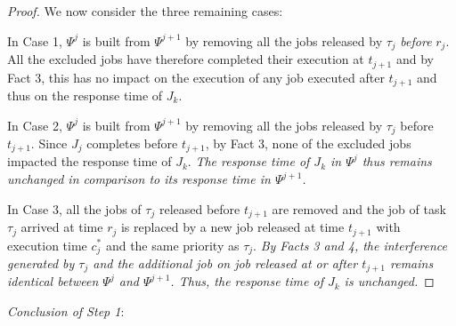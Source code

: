 \begin{proof}

We now consider the three remaining cases:

\noindent In Case 1, $\Psi^j$ is built from $\Psi^{j+1}$ by removing all the jobs released by $\tau_j$ \emph{before} $r_j$.  All the excluded jobs have therefore completed their execution at $t_{j+1}$ and by Fact 3, this has no impact on the execution of any job executed after $t_{j+1}$ and thus on the response time of $J_k$.

\noindent In Case 2, $\Psi^j$ is built from $\Psi^{j+1}$ by removing all the jobs released by $\tau_j$ before $t_{j+1}$. Since $J_{j}$ completes before $t_{j+1}$, by Fact 3, none of the excluded jobs impacted the response time of $J_k$. \emph{The response time of $J_{k}$ in $\Psi^j$ thus remains unchanged in comparison to its response time in $\Psi^{j+1}$.}

\noindent In Case 3, all the jobs of $\tau_j$ released before $t_{j+1}$ are removed and the job of task $\tau_j$ arrived at time $r_j$ is replaced by a new job released at time $t_{j+1}$ with execution time $c_j^*$ and the same priority as $\tau_j$. \emph{By Facts 3 and 4, the interference generated by $\tau_j$ and the additional job on job released at or after $t_{j+1}$ remains identical between $\Psi^j$ and $\Psi^{j+1}$. Thus, the response time of $J_k$ is unchanged.} 
\end{proof}

 
\noindent\textit{Conclusion of Step 1}:

